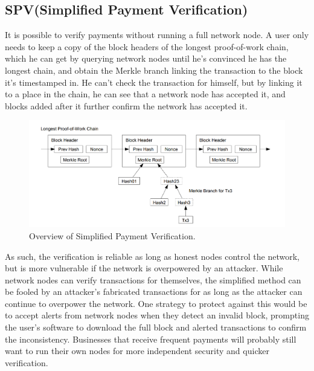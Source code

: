 \documentclass{article}
\begin{document}
\subsection{SPV(Simplified Payment Verification)}
It is possible to verify payments without running a full network node. A user only needs to keep a copy of the block headers of the longest proof-of-work chain, which he can get by querying network nodes until he's convinced he has the longest chain, and obtain the Merkle branch linking the transaction to the block it's timestamped in. He can't check the transaction for himself, but by linking it to a place in the chain, he can see that a network node has accepted it, and blocks added after it further confirm the network has accepted it.\cite{spv}
\begin{figure}[h]
\centering
\includegraphics[width=1\textwidth]{spv.png}
\caption{\label{fig:spv}Overview of Simplified Payment Verification.}
\end{figure}
\par As such, the verification is reliable as long as honest nodes control the network, but is more vulnerable if the network is overpowered by an attacker. While network nodes can verify transactions for themselves, the simplified method can be fooled by an attacker's fabricated transactions for as long as the attacker can continue to overpower the network. One strategy to protect against this would be to accept alerts from network nodes when they detect an invalid block, prompting the user's software to download the full block and alerted transactions to confirm the inconsistency. Businesses that receive frequent payments will probably still want to run their own nodes for more independent security and quicker verification.
\end{document}
